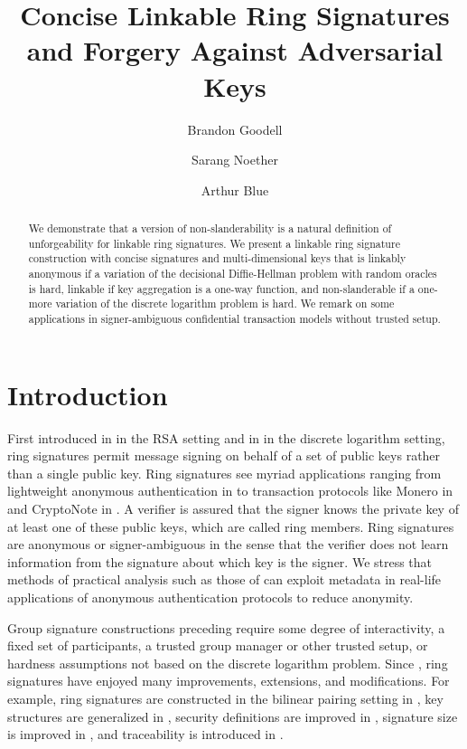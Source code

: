 \documentclass{llncs}
\title{Concise Linkable Ring Signatures and Forgery Against Adversarial Keys}
\institute{Monero Research Lab, \email{\{surae,sarang\}@getmonero.org} \and Independent researcher, \email{randomrun@protonmail.com}}
\author{Brandon Goodell\inst{1} \and Sarang Noether\inst{1} \and Arthur Blue\inst{2}}
\begin{document}
\maketitle

\begin{abstract}
We demonstrate that a version of non-slanderability is a natural definition of unforgeability for linkable ring signatures. We present a linkable ring signature construction with concise signatures and multi-dimensional keys that is linkably anonymous if a variation of the decisional Diffie-Hellman problem with random oracles is hard, linkable if key aggregation is a one-way function, and non-slanderable if a one-more variation of the discrete logarithm problem is hard. We remark on some applications in signer-ambiguous confidential transaction models without trusted setup.
\end{abstract}


\section{Introduction}

First introduced in \cite{rivest} in the RSA setting and in \cite{liu2004linkable} in the discrete logarithm setting, ring signatures permit message signing on behalf of a set of public keys rather than a single public key. Ring signatures see myriad applications ranging from lightweight anonymous authentication in \cite{yang2015lightweight} to transaction protocols like Monero in \cite{noether2016ring} and CryptoNote in \cite{van2013cryptonote}. A verifier is assured that the signer knows the private key of at least one of these public keys, which are called ring members. Ring signatures are anonymous or signer-ambiguous in the sense that the verifier does not learn information from the signature about which key is the signer. We stress that methods of practical analysis such as those of  \cite{moser2018empirical,quesnelle2017linkability} can exploit metadata in real-life applications of anonymous authentication protocols to reduce anonymity.

Group signature constructions preceding \cite{rivest,liu2004linkable} require some degree of interactivity, a fixed set of participants, a trusted group manager or other trusted setup, or hardness assumptions not based on the discrete logarithm problem. Since \cite{rivest}, ring signatures have enjoyed many improvements, extensions, and modifications. For example, ring signatures are constructed in the bilinear pairing setting in \cite{zhang2002id}, key structures are generalized in \cite{abe20021}, security definitions are improved in \cite{bender2006ring}, signature size is improved in \cite{fujisaki2011sub,gu2018constant}, and traceability is introduced in \cite{fujisaki2007traceable}.
\end{document}
